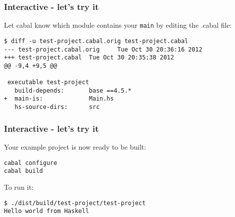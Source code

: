 \documentclass{beamer}
\begin{document}
\begin{frame}[fragile]
\frametitle{Interactive - let's try it}
Let cabal know which module contains your \verb+main+ by editing the .cabal file:

\begin{verbatim}
$ diff -u test-project.cabal.orig test-project.cabal
--- test-project.cabal.orig     Tue Oct 30 20:36:16 2012
+++ test-project.cabal  Tue Oct 30 20:35:38 2012
@@ -9,4 +9,5 @@

 executable test-project
   build-depends:       base ==4.5.*
+  main-is:             Main.hs
   hs-source-dirs:      src
\end{verbatim}

\end{frame}

\begin{frame}[fragile]
\frametitle{Interactive - let's try it}

Your example project is now ready to be built:

\begin{verbatim}
cabal configure
cabal build
\end{verbatim}

To run it:
\begin{verbatim}
$ ./dist/build/test-project/test-project
Hello world from Haskell
\end{verbatim}

\end{frame}
\end{document}
